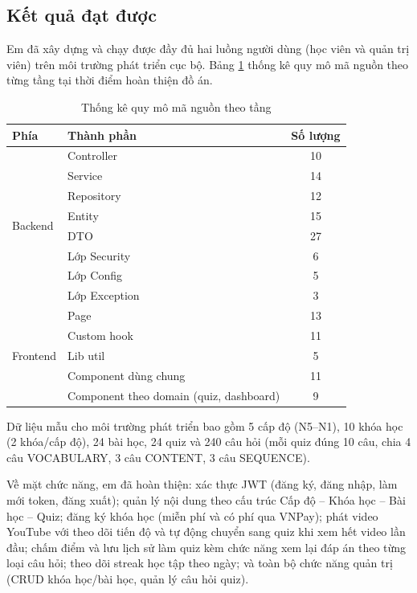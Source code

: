 \documentclass[../DoAn.tex]{subfiles}
\begin{document}
\subsection{Kết quả đạt được}
\label{subsection:4.3.2}

Em đã xây dựng và chạy được đầy đủ hai luồng người dùng (học viên và quản trị viên) trên môi trường phát triển cục bộ. Bảng \ref{table:4.2} thống kê quy mô mã nguồn theo từng tầng tại thời điểm hoàn thiện đồ án.

\begin{table}[H]
\centering
\renewcommand{\arraystretch}{1.1}
\begin{tabular}{llc}
\hline
\textbf{Phía} & \textbf{Thành phần} & \textbf{Số lượng} \\ \hline
\multirow{8}{*}{Backend} & Controller & 10 \\
 & Service & 14 \\
 & Repository & 12 \\
 & Entity & 15 \\
 & DTO & 27 \\
 & Lớp Security & 6 \\
 & Lớp Config & 5 \\
 & Lớp Exception & 3 \\ \hline
\multirow{5}{*}{Frontend} & Page & 13 \\
 & Custom hook & 11 \\
 & Lib util & 5 \\
 & Component dùng chung & 11 \\
 & Component theo domain (quiz, dashboard) & 9 \\ \hline
\end{tabular}
\caption{Thống kê quy mô mã nguồn theo tầng}
\label{table:4.2}
\end{table}

Dữ liệu mẫu cho môi trường phát triển bao gồm 5 cấp độ (N5--N1), 10 khóa học (2 khóa/cấp độ), 24 bài học, 24 quiz và 240 câu hỏi (mỗi quiz đúng 10 câu, chia 4 câu VOCABULARY, 3 câu CONTENT, 3 câu SEQUENCE).

Về mặt chức năng, em đã hoàn thiện: xác thực JWT (đăng ký, đăng nhập, làm mới token, đăng xuất); quản lý nội dung theo cấu trúc Cấp độ -- Khóa học -- Bài học -- Quiz; đăng ký khóa học (miễn phí và có phí qua VNPay); phát video YouTube với theo dõi tiến độ và tự động chuyển sang quiz khi xem hết video lần đầu; chấm điểm và lưu lịch sử làm quiz kèm chức năng xem lại đáp án theo từng loại câu hỏi; theo dõi streak học tập theo ngày; và toàn bộ chức năng quản trị (CRUD khóa học/bài học, quản lý câu hỏi quiz).
\end{document}
